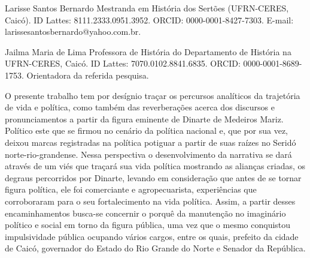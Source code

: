 \begin{refsection}
    \renewcommand{\thefigure}{\arabic{figure}}
    
    \label{chap:caminhosdesdo}
    
    \articleAuthor
    {Larisse Santos Bernardo}
    {Mestranda em História dos Sertões (UFRN-CERES, Caicó). ID Lattes: 8111.2333.0951.3952. ORCID: 0000-0001-8427-7303. E-mail: larissesantosbernardo@yahoo.com.br.}

    \articleAuthor
    {Jailma Maria de Lima}
    {Professora de História do Departamento de História na UFRN-CERES, Caicó. ID Lattes: 7070.0102.8841.6835. ORCID: 0000-0001-8689-1753. Orientadora da referida pesquisa.}

    \begin{galoResumo}
        O presente trabalho tem por desígnio traçar os percursos analíticos da trajetória de vida e política, como também das reverberações acerca dos discursos e pronunciamentos a partir da figura eminente de Dinarte de Medeiros Mariz. Político este que se firmou no cenário da política nacional e, que por sua vez, deixou marcas registradas na política potiguar a partir de suas raízes no Seridó norte-rio-grandense. Nessa perspectiva o desenvolvimento da narrativa se dará através de um viés que traçará sua vida política mostrando as alianças criadas, os degraus percorridos por Dinarte, levando em consideração que antes de se tornar figura política, ele foi comerciante e agropecuarista, experiências que corroboraram para o seu fortalecimento na vida política. Assim, a partir desses encaminhamentos busca-se concernir o porquê da manutenção no imaginário político e social em torno da figura pública, uma vez que o mesmo conquistou impulsividade pública ocupando vários cargos, entre os quais, prefeito da cidade de Caicó, governador do Estado do Rio Grande do Norte e Senador da República.
    \end{galoResumo}
    
    

\end{refsection}
